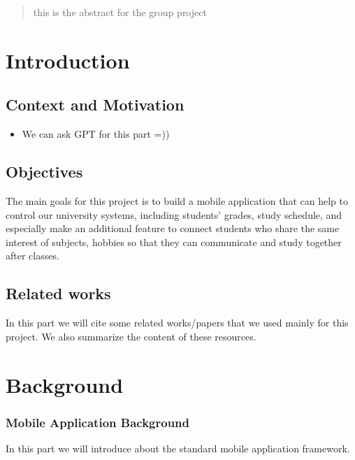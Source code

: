 \documentclass{article}
\begin{document}


\tableofcontents
\newpage
\begin{abstract}
    this is the abstract for  the group project
\end{abstract}


\section{Introduction}

\subsection{Context and Motivation}
\begin{itemize}
    \item We can ask GPT for this part =))
\end{itemize}
\subsection{Objectives}

    The main goals for this project is to build a mobile application
    that can help to control our university systems, including students'
    grades, study schedule, and especially make an additional feature to connect 
    students who share the same interest of subjects, hobbies so that they can communicate
    and study together after classes.


\subsection{Related works}

In this part we will cite some related works/papers that we used mainly for this 
project. We also summarize the content of these resources.


\section{Background}
\subsubsection{Mobile Application Background}
In this part we will introduce about the standard mobile application framework.
\end{document}
